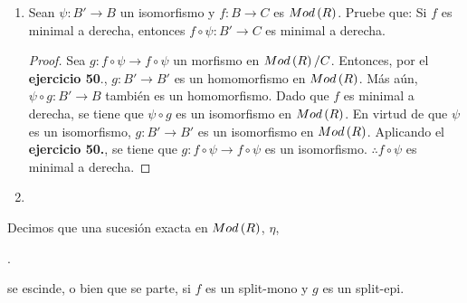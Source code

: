 \documentclass{article}
\begin{document}
\begin{enumerate}[label=\textbf{Ej \arabic*.}]
\begin{proof}
\begin{equation*}
\begin{split}
				gq'&=h.
			\end{split}
			\end{equation*}
		Así $p'p\in\ringmodhom{R}{A}{B}$, $qq'\in\ringmodhom{R}{B}{A}$ y
		\begin{equation*}
			\begin{split}
				h\lrprth{p'p}&=f\\
				f\lrprth{qq'}&=h,\\			
				\therefore\ f&\sim h.
			\end{split}
		\end{equation*}
		\end{proof}
		\item Sean $\psi : B' \longrightarrow B$ un isomorfismo y $f:B \longrightarrow C$ es $Mod\left(R\right)$. Pruebe que: Si $f$ es minimal a derecha, entonces $f\circ\psi :B' \longrightarrow C$ es minimal a derecha.
		\begin{proof}
			Sea $g:f\circ\psi \longrightarrow f\circ\psi$ un morfismo en $Mod\left(R\right)/C$. Entonces, por el \textbf{ejercicio 50}., $g:B' \longrightarrow B'$ es un homomorfismo en $Mod\left(R\right)$. Más aún, $\psi \circ g:B' \longrightarrow B$ también es un homomorfismo. Dado que $f$ es minimal a derecha, se tiene que $\psi \circ g$ es un isomorfismo en $Mod\left(R\right)$. En virtud de que $\psi$ es un isomorfismo, $g:B' \longrightarrow B'$ es un isomorfismo en $Mod\left(R\right)$. Aplicando el \textbf{ejercicio 50.}, se tiene que $g:f\circ\psi \longrightarrow f\circ\psi$ es un isomorfismo. $\therefore f\circ\psi$ es minimal a derecha.
		\end{proof}
		\item
	\end{enumerate}
\begin{define}
	Decimos que una sucesión exacta en $Mod\left(R\right)$, $\eta$, \begin{center}
		.
	\end{center}
	se escinde, o bien que se parte, si $f$ es un split-mono y $g$ es un split-epi.			
\end{define}
\end{document}
